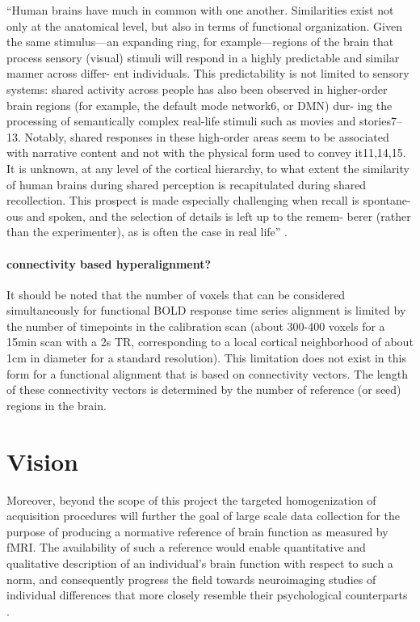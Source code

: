 ``Human brains have much in common with one another. Similarities exist not only
at the anatomical level, but also in terms of functional organization. Given the
same stimulus—an expanding ring, for example—regions of the brain that process
sensory (visual) stimuli will respond in a highly predictable and similar manner
across differ- ent individuals. This predictability is not limited to sensory
systems: shared activity across people has also been observed in higher-order
brain regions (for example, the default mode network6, or DMN) dur- ing the
processing of semantically complex real-life stimuli such as movies and
stories7–13. Notably, shared responses in these high-order areas seem to be
associated with narrative content and not with the physical form used to convey
it11,14,15. It is unknown, at any level of the cortical hierarchy, to what
extent the similarity of human brains during shared perception is recapitulated
during shared recollection. This prospect is made especially challenging when
recall is spontane- ous and spoken, and the selection of details is left up to
the remem- berer (rather than the experimenter), as is often the case in real
life'' \citep{chen2017shared}.


\paragraph{connectivity based hyperalignment?}
%
It should be noted that the number of voxels that can be considered
simultaneously for functional BOLD response time series alignment is limited by
the number of timepoints in the calibration scan (about 300-400 voxels for a
15min scan with a 2s TR, corresponding to a local cortical neighborhood of about
1cm in diameter for a standard resolution).
%
This limitation does not exist in this form for a functional alignment that is
based on connectivity vectors.
%
The length of these connectivity vectors is determined by the number of
reference (or seed) regions in the brain.


\section{Vision}
%
Moreover, beyond the scope of this project the targeted homogenization of
acquisition procedures will further the goal of large scale data collection for
the purpose of producing a normative reference of brain function as measured by
fMRI.
%
The availability of such a reference would enable quantitative and qualitative
description of an individual's brain function with respect to such a norm, and
consequently progress the field towards neuroimaging studies of individual
differences that more closely resemble their psychological counterparts
\citep{dubois2016building}.

